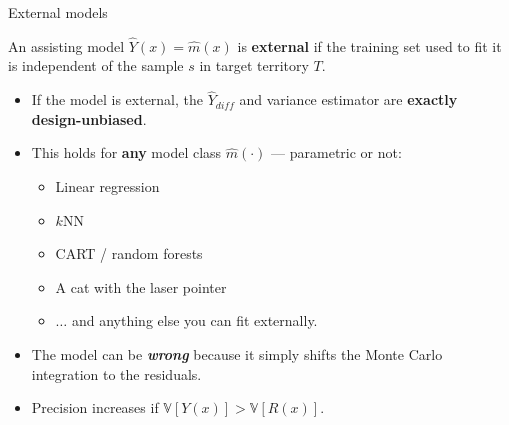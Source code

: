 \documentclass[
  ignorenonframetext,
  aspectratio=169,
]{beamer}
\providecommand{\tightlist}{%
  \setlength{\itemsep}{0pt}\setlength{\parskip}{0pt}}
\begin{document}
\begin{frame}{External models}
\label{external-models}
\footnotesize

\begin{definition}
An assisting model $\hat{Y}(x) = \hat m(x)$ is \textbf{external} if the training set used to fit it is independent of the sample $s$ in target territory $T$.
\end{definition}

\pause

\begin{itemize}
\tightlist
\item
  If the model is external, the \(\hat{Y}_{diff}\) and variance
  estimator are \textbf{exactly design-unbiased}.
\item
  This holds for \textbf{any} model class \(\hat m(\cdot)\) ---
  parametric or not:

  \begin{itemize}
  \tightlist
  \item
    Linear regression
  \item
    \(k\)NN
  \item
    CART / random forests
  \item
    A cat with the laser pointer
  \item
    \(\dots\) and anything else you can fit externally.
  \end{itemize}
\item
  The model can be \textbf{\textit{wrong}} because it simply shifts the
  Monte Carlo integration to the residuals.
\item
  Precision increases if \(\mathbb{V}[Y(x)]>\mathbb{V}[R(x)]\).
\end{itemize}
\end{frame}
\end{document}
